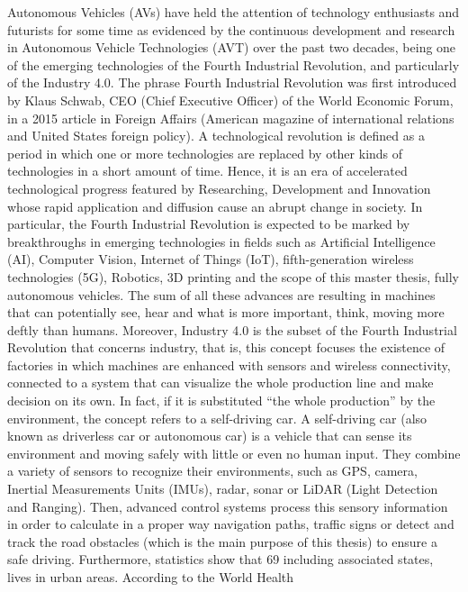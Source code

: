 Autonomous Vehicles (AVs) have held the attention of technology enthusiasts and futurists
for some time as evidenced by the continuous development and research in Autonomous
Vehicle Technologies (AVT) over the past two decades, being one of the emerging
technologies of the Fourth Industrial Revolution, and particularly of the Industry 4.0.
The phrase Fourth Industrial Revolution was first introduced by Klaus Schwab, CEO (Chief
Executive Officer) of the World Economic Forum, in a 2015 article in Foreign Affairs
(American magazine of international relations and United States foreign policy). A
technological revolution is defined as a period in which one or more technologies are
replaced by other kinds of technologies in a short amount of time. Hence, it is an era of
accelerated technological progress featured by Researching, Development and Innovation
whose rapid application and diffusion cause an abrupt change in society. In particular, the
Fourth Industrial Revolution is expected to be marked by breakthroughs in emerging
technologies in fields such as Artificial Intelligence (AI), Computer Vision, Internet of Things
(IoT), fifth-generation wireless technologies (5G), Robotics, 3D printing and the scope of
this master thesis, fully autonomous vehicles. The sum of all these advances are resulting in
machines that can potentially see, hear and what is more important, think, moving more
deftly than humans.
Moreover, Industry 4.0 is the subset of the Fourth Industrial Revolution that concerns
industry, that is, this concept focuses the existence of factories in which machines are
enhanced with sensors and wireless connectivity, connected to a system that can visualize
the whole production line and make decision on its own. In fact, if it is substituted “the whole
production” by the environment, the concept refers to a self-driving car.
A self-driving car (also known as driverless car or autonomous car) is a vehicle that can
sense its environment and moving safely with little or even no human input. They combine
a variety of sensors to recognize their environments, such as GPS, camera, Inertial
Measurements Units (IMUs), radar, sonar or LiDAR (Light Detection and Ranging). Then,
advanced control systems process this sensory information in order to calculate in a proper
way navigation paths, traffic signs or detect and track the road obstacles (which is the main
purpose of this thesis) to ensure a safe driving.
Furthermore, statistics show that 69 %
including associated states, lives in urban areas. According to the World Health
